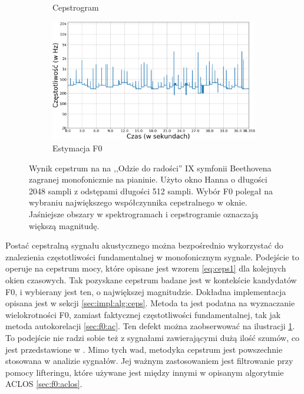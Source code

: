 \documentclass[12pt,a4paper,twoside]{mwart}
\begin{document}
\begin{figure}[t]
\begin{subfigure}{.49\textwidth}
    \caption{Cepstrogram}
  \end{subfigure}
  \begin{subfigure}{.5\textwidth}
    \centering
    \includegraphics[width=1.\linewidth]{images/Cepstrum/estymacjaF0_cropped.png}
    \caption{Estymacja F0}
  \end{subfigure}
  \caption{Wynik cepstrum na na ,,Odzie do radości'' IX symfonii Beethovena zagranej monofonicznie na pianinie. Użyto okno Hanna o długości 2048 sampli z odstępami długości 512 sampli. Wybór F0 polegał na wybraniu największego współczynnika cepstralnego w oknie. Jaśniejsze obszary w spektrogramach i cepstrogramie oznaczają większą magnitudę.}
  \label{fig:cepstrumF0}
\end{figure}

Postać cepstralną sygnału akustycznego można bezpośrednio wykorzystać do znalezienia częstotliwości fundamentalnej w monofonicznym sygnale. Podejście to operuje na cepstrum mocy, które opisane jest wzorem \ref{eq:ceps1} dla kolejnych okien czasowych. Tak pozyskane cepstrum badane jest w kontekście kandydatów F0, i wybierany jest ten, o największej magnitudzie. Dokładna implementacja opisana jest w sekcji \ref{sec:impl:alg:ceps}. Metoda ta jest podatna na wyznaczanie wielokrotności F0, zamiast faktycznej częstotliwości fundamentalnej, tak jak metoda autokorelacji \ref{sec:f0:ac}. Ten defekt można zaobserwować na ilustracji \ref{fig:cepstrumF0}. To podejście nie radzi sobie też z sygnałami zawierającymi dużą ilość szumów, co jest przedstawione w \cite[233-235]{Transcription:Kunieda:Aclos}. Mimo tych wad, metodyka cepstrum jest powszechnie stosowana w analizie sygnałów. Jej ważnym zastosowaniem jest filtrowanie przy pomocy lifteringu, które używane jest między innymi w opisanym algorytmie ACLOS \ref{sec:f0:aclos}.
\end{document}
